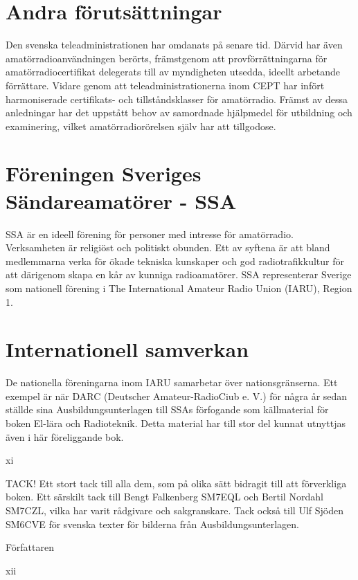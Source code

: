 \documentclass[a4paper,twoside,twocolumn,openright]{book}
\begin{document}
\section*{Andra förutsättningar}

Den svenska teleadministrationen har omdanats på senare tid. Därvid har även amatörradioanvändningen berörts, främstgenom
att provförrättningarna för amatörradiocertifikat delegerats till av myndigheten utsedda,
ideellt arbetande förrättare. Vidare genom
att teleadministrationerna inom CEPT har
infört harmoniserade certifikats- och tillståndsklasser för amatörradio.
Främst av dessa anledningar har det
uppstått behov av samordnade hjälpmedel
för utbildning och examinering, vilket amatörradiorörelsen själv har att tillgodose.

\section*{Föreningen Sveriges Sändareamatörer - SSA}

SSA är en ideell förening för personer med
intresse för amatörradio. Verksamheten är
religiöst och politiskt obunden. Ett av syftena
är att bland medlemmarna verka för ökade
tekniska kunskaper och god radiotrafikkultur
för att därigenom skapa en kår av kunniga
radioamatörer. SSA representerar Sverige
som nationell förening i The International
Amateur Radio Union (IARU), Region 1.

\section*{Internationell samverkan}

De nationella föreningarna inom IARU samarbetar över nationsgränserna. Ett exempel
är när DARC (Deutscher Amateur-RadioCiub e. V.) för några år sedan ställde sina
Ausbildungsunterlagen till SSAs förfogande
som källmaterial för boken El-lära och Radioteknik.
Detta material har till stor del kunnat
utnyttjas även i här föreliggande bok.

xi

\pagebreak

TACK!
Ett stort tack till alla dem, som på olika sätt
bidragit till att förverkliga boken.
Ett särskilt tack till Bengt Falkenberg
SM7EQL och Bertil Nordahl SM7CZL, vilka
har varit rådgivare och sakgranskare.
Tack också till Ulf Sjöden SM6CVE för
svenska texter för bilderna från Ausbildungsunterlagen.

Författaren

xii
\end{document}
